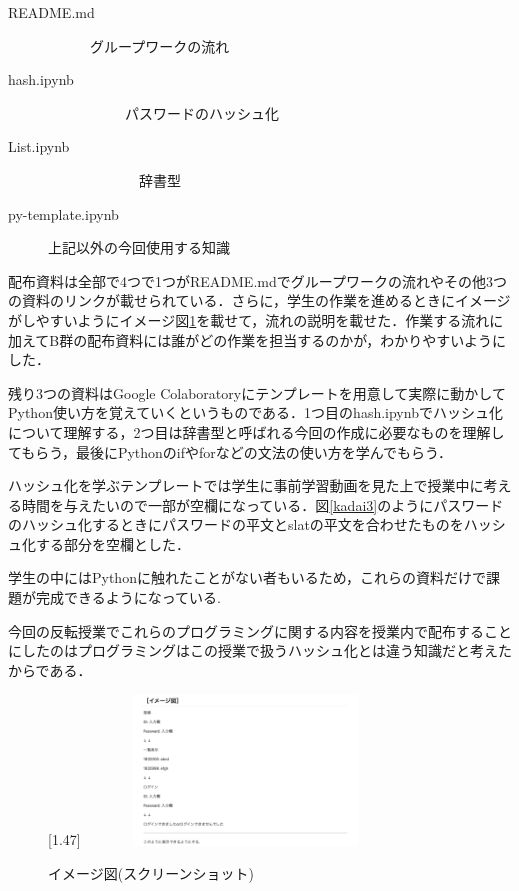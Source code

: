 \documentclass[a4j,11pt]{jsarticle}
\begin{document}
\begin{description}

 \item[README.md]   \ \ \ \ \ \      グループワークの流れ
  \item[hash.ipynb]\ \ \ \ \ \ \ \ \ \ \ パスワードのハッシュ化
  \item[List.ipynb]\ \ \ \ \ \ \ \ \ \ \ \ \  辞書型
  \item[py-template.ipynb]上記以外の今回使用する知識
  
\end{description}

配布資料は全部で4つで1つがREADME.mdでグループワークの流れやその他3つの資料のリンクが載せられている．さらに，学生の作業を進めるときにイメージがしやすいようにイメージ図\ref{kadai2}を載せて，流れの説明を載せた．作業する流れに加えてB群の配布資料には誰がどの作業を担当するのかが，わかりやすいようにした．

残り3つの資料はGoogle Colaboratoryにテンプレートを用意して実際に動かしてPython使い方を覚えていくというものである．1つ目のhash.ipynbでハッシュ化について理解する，2つ目は辞書型と呼ばれる今回の作成に必要なものを理解してもらう，最後にPythonのifやforなどの文法の使い方を学んでもらう．

ハッシュ化を学ぶテンプレートでは学生に事前学習動画を見た上で授業中に考える時間を与えたいので一部が空欄になっている．図\ref{kadai3}のようにパスワードのハッシュ化するときにパスワードの平文とslatの平文を合わせたものをハッシュ化する部分を空欄とした．

学生の中にはPythonに触れたことがない者もいるため，これらの資料だけで課題が完成できるようになっている.

今回の反転授業でこれらのプログラミングに関する内容を授業内で配布することにしたのはプログラミングはこの授業で扱うハッシュ化とは違う知識だと考えたからである．

\begin{figure}[h]
\begin{center}
\scalebox{1.6}[1.47]{
 \includegraphics[clip,width=85mm,height=40mm]{kadai2.pdf}
 }
\end{center}
 \caption{イメージ図(スクリーンショット)}
 \label{kadai2}
\end{figure}
\end{document}

